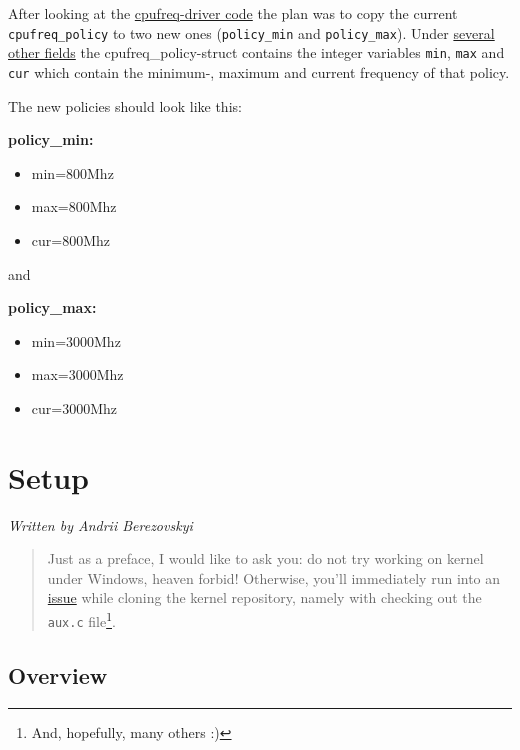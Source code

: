 \documentclass[]{report}
\begin{document}
After looking at the
\href{http://lxr.free-electrons.com/source/drivers/cpufreq/cpufreq.c}{cpufreq-driver
code} the plan was to copy the current \lstinline!cpufreq_policy! to two
new ones (\lstinline!policy_min! and \lstinline!policy_max!). Under
\href{http://lxr.free-electrons.com/source/include/linux/cpufreq.h?v=3.10\#L91}{several
other fields} the cpufreq\_policy-struct contains the integer variables
\lstinline!min!, \lstinline!max! and \lstinline!cur! which contain the
minimum-, maximum and current frequency of that policy.

The new policies should look like this:

\textbf{policy\_min:}

\begin{itemize}
\itemsep1pt\parskip0pt
\item
  min=800Mhz
\item
  max=800Mhz
\item
  cur=800Mhz
\end{itemize}

and

\textbf{policy\_max:}

\begin{itemize}
\itemsep1pt\parskip0pt
\item
  min=3000Mhz
\item
  max=3000Mhz
\item
  cur=3000Mhz
\end{itemize}

\chapter{Setup}\label{setup}

\emph{Written by Andrii Berezovskyi}

\begin{quote}
Just as a preface, I would like to ask you: do not try working on kernel
under Windows, heaven forbid! Otherwise, you'll immediately run into an
\href{http://stackoverflow.com/questions/3689137/error-git-checkout-index-\%20unable-to-create-file}{issue}
while cloning the kernel repository, namely with checking out the
\lstinline!aux.c! file\footnote{And, hopefully, many others :)}.
\end{quote}

\section{Overview}\label{overview-1}
\end{document}
